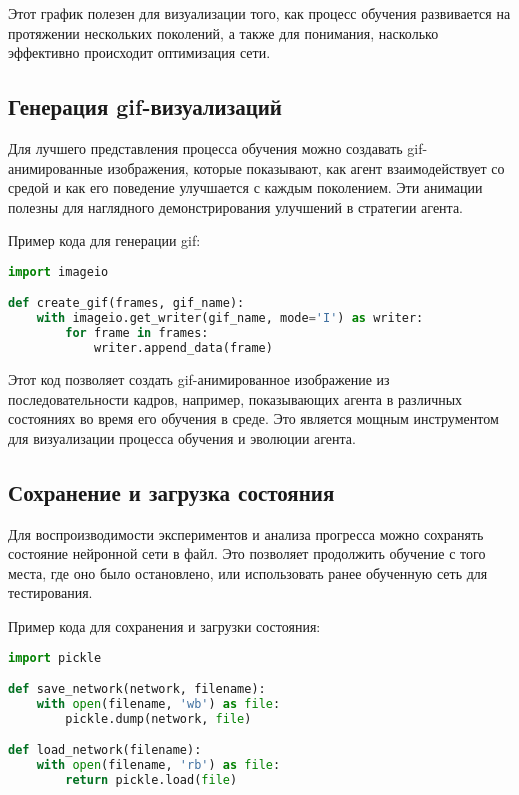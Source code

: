 \documentclass[a4paper,12pt]{article}
\begin{document}
Этот график полезен для визуализации того, как процесс обучения развивается на протяжении нескольких поколений, а также для понимания, насколько эффективно происходит оптимизация сети.

\subsection{Генерация gif-визуализаций}

Для лучшего представления процесса обучения можно создавать gif-анимированные изображения, которые показывают, как агент взаимодействует со средой и как его поведение улучшается с каждым поколением. Эти анимации полезны для наглядного демонстрирования улучшений в стратегии агента.

Пример кода для генерации gif:

\begin{lstlisting}[language=Python]
import imageio

def create_gif(frames, gif_name):
    with imageio.get_writer(gif_name, mode='I') as writer:
        for frame in frames:
            writer.append_data(frame)
\end{lstlisting}

Этот код позволяет создать gif-анимированное изображение из последовательности кадров, например, показывающих агента в различных состояниях во время его обучения в среде. Это является мощным инструментом для визуализации процесса обучения и эволюции агента.

\subsection{Сохранение и загрузка состояния}

Для воспроизводимости экспериментов и анализа прогресса можно сохранять состояние нейронной сети в файл. Это позволяет продолжить обучение с того места, где оно было остановлено, или использовать ранее обученную сеть для тестирования.

Пример кода для сохранения и загрузки состояния:

\begin{lstlisting}[language=Python]
import pickle

def save_network(network, filename):
    with open(filename, 'wb') as file:
        pickle.dump(network, file)

def load_network(filename):
    with open(filename, 'rb') as file:
        return pickle.load(file)
\end{lstlisting}
\end{document}
